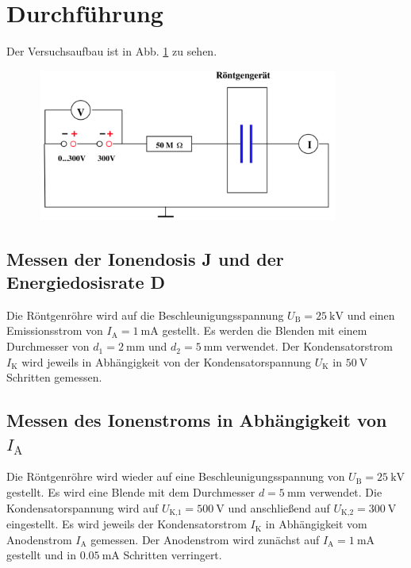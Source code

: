 \section{Durchführung}
\label{sec:Durchführung}

Der Versuchsaufbau ist in Abb. \ref{fig:aufbau} zu sehen.
\begin{figure}
    \centering
    \includegraphics[width=10cm, height=5cm]{build/aufbau.png}
    \caption{\cite{V607}}
    \label{fig:aufbau}
\end{figure}

\subsection{Messen der Ionendosis J und der Energiedosisrate D} %
Die Röntgenröhre wird auf die Beschleunigungsspannung
$U_\text{B} = \SI{25}{\kilo\volt}$ und einen Emissionsstrom 
von $I_\text{A} = \SI{1}{\milli\ampere}$ gestellt.
Es werden die Blenden mit einem Durchmesser von
$d_1 = \SI{2}{\milli\meter}$ und $d_2 = \SI{5}{\milli\meter}$ 
verwendet.
\newline
Der Kondensatorstrom $I_\text{K}$ wird jeweils in Abhängigkeit
von der Kondensatorspannung $U_\text{K}$ in $\SI{50}{\volt}$ 
Schritten gemessen.

\subsection{Messen des Ionenstroms in Abhängigkeit von $I_\text{A}$}
Die Röntgenröhre wird wieder auf eine Beschleunigungsspannung von
$U_\text{B} = \SI{25}{\kilo\volt}$ gestellt. Es wird eine
Blende mit dem Durchmesser $d = \SI{5}{\milli\meter}$
verwendet. Die Kondensatorspannung wird auf 
$U_\text{K,1} = \SI{500}{\volt}$ und anschließend auf
$U_\text{K,2} = \SI{300}{\volt}$ eingestellt.
\newline
Es wird jeweils der Kondensatorstrom $I_\text{K}$ in
Abhängigkeit vom Anodenstrom $I_\text{A}$ gemessen.
Der Anodenstrom wird zunächst auf $I_\text{A} = \SI{1}{\milli\ampere}$
gestellt und in $\SI{0.05}{\milli\ampere}$ Schritten verringert.


